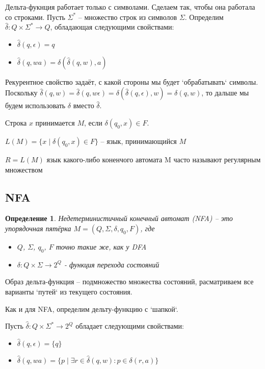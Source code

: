 \documentclass[5pt]{article}
\newtheorem{definition}{Определение}
\begin{document}
Дельта-фукнция работает только с символами. Сделаем так, чтобы она работала со строками.
Пусть $\Sigma^*$ -- множество строк из символов $\Sigma$.
Определим $\hat{\delta}: Q \times \Sigma^* \rightarrow Q$, обладающая следующими свойствами:
\begin{itemize}
  \item $\hat{\delta}(q, \epsilon) = q$
  \item $\hat{\delta}(q, wa) = \delta(\hat{\delta}(q, w), a)$
\end{itemize}

Рекурентное свойство задаёт, с какой стороны мы будет `обрабатывать` символы.
Поскольку $\hat{\delta}(q, w) = \hat{\delta}(q, w\epsilon) = \delta(\hat{\delta}(q, \epsilon), w) = \delta(q, w)$,
то дальше мы будем использовать $\delta$ вместо $\hat{\delta}$.

Строка $x$ принимается $M$, если $\delta(q_0, x) \in F$.

$L(M) = \{x \mid \delta(q_0, x) \in F\}$ -- язык, принимающийся $M$

$R = L(M)$ язык какого-либо коненчого автомата M часто называют регулярным множеством

\subsection{NFA}

\begin{definition}
Недетерминистичный конечный автомат (NFA) -- это упорядочная пятёрка
$M = (Q, \Sigma, \delta ,q_0, F)$, где
\begin{itemize}
  \item $Q$, $\Sigma$, $q_0$, $F$ точно такие же, как у DFA
  \item $\delta: Q \times \Sigma \rightarrow 2^Q$ - функция перехода состояний
\end{itemize}
\end{definition}

Образ дельта-функция -- подмножество множества состояний, расматриваем все варианты `путей` из текущего состояния.

Как и для NFA, определим дельту-функцию с `шапкой`.

Пусть $\hat{\delta}: Q \times \Sigma^* \rightarrow 2^Q$ обладает следующими свойствами:
\begin{itemize}
  \item $\hat{\delta}(q, \epsilon) = \{q\}$
  \item $\hat{\delta}(q, wa) = \{p \mid \exists r \in \hat{\delta}(q, w): p \in \delta(r,a)\}$
\end{itemize}
\end{document}
